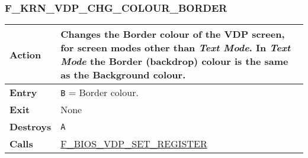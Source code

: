    \subsubsection{F\_KRN\_VDP\_CHG\_COLOUR\_BORDER}
    \label{func:fkrnvdpchgcolourborder}
    \begin{tabular}{l p{15cm}}
        \hline\textbf{Action}
        & Changes the Border colour of the \textbf{VDP} screen, for screen
        modes other than \textit{Text Mode}. In \textit{Text Mode} the
        Border (backdrop) colour is the same as the Background colour.\\
        \hline\textbf{Entry} & \texttt{B} = Border colour.\\
        \hline\textbf{Exit} & None\\
        \hline\textbf{Destroys} & \texttt{A}\\
        \hline\textbf{Calls}
        & \hyperref[func:fbiosvdpsetregister]{F\_BIOS\_VDP\_SET\_REGISTER}\\
        \hline
    \end{tabular}